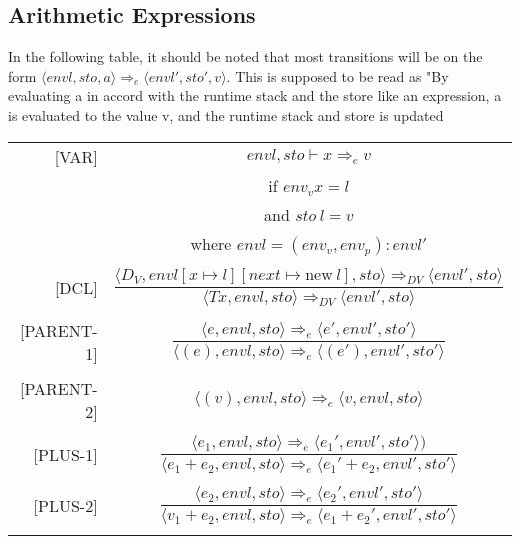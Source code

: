 \subsection{Arithmetic Expressions}
In the following table, it should be noted that most transitions will be on the form \( \langle envl, sto, a \rangle \Rightarrow_e \langle envl', sto', v \rangle \). This is supposed to be read as "By evaluating a in accord with the runtime stack and the store like an expression, a is evaluated to the value v, and the runtime stack and store is updated

\begin{longtable}[c] { r c }
  \centering
  
  [VAR] & \( envl, sto \vdash x \Rightarrow_e v \) \\
  & if \(env_v x = l \) \\
  & and \(sto \ l = v \) \\
  & where \(envl = (env_v, env_p) : envl' \) \\
  &  \\

  [DCL] & \( 
    \dfrac{ \langle D_V, envl[x \mapsto l][next \mapsto \text{new} \ l], sto \rangle \Rightarrow_{DV} \langle envl', sto \rangle}
    { \langle T x, envl, sto \rangle \Rightarrow_{DV} \langle envl', sto \rangle } \) \\
  & \\

  [PARENT-1] & 
    \( \dfrac { \langle e, envl, sto \rangle \Rightarrow_e \langle e', envl', sto' \rangle }
      { \langle (e), envl, sto \rangle  \Rightarrow_e \langle (e'), envl', sto' \rangle } \) \\
  & \\

  [PARENT-2] & 
    \( \langle (v), envl, sto \rangle \Rightarrow_e \langle v, envl, sto \rangle \) \\
  & \\

  [PLUS-1] & 
    \( \dfrac { \langle e_1, envl, sto \rangle \Rightarrow_e \langle e_1', envl', sto' \rangle )}
      {\langle e_1 + e_2, envl, sto \rangle \Rightarrow_e \langle e_1' + e_2, envl', sto' \rangle } \) \\
  & \\

  [PLUS-2] & 
    \( \dfrac { \langle e_2, envl, sto \rangle \Rightarrow_e \langle e_2', envl', sto' \rangle }
      {\langle v_1 + e_2, envl, sto \rangle  \Rightarrow_e \langle e_1 + e_2', envl', sto' \rangle } \) \\
  & \\


\end{longtable}
